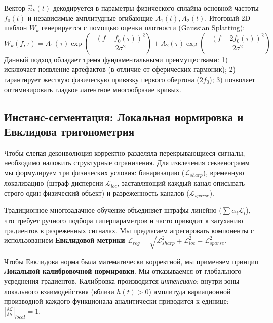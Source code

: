 \documentclass[11pt,a4paper]{article}
\begin{document}
Вектор $\vec{n}_k(t)$ декодируется в параметры физического сплайна основной частоты $f_0(t)$ и независимые амплитудные огибающие $A_1(t), A_2(t)$. Итоговый 2D-шаблон $W_k$ генерируется с помощью оценки плотности (Gaussian Splatting):
\begin{equation}
W_k(f, \tau) = A_1(\tau) \exp\left( - \frac{(f - f_0(\tau))^2}{2\sigma^2} \right) + A_2(\tau) \exp\left( - \frac{(f - 2f_0(\tau))^2}{2\sigma^2} \right)
\end{equation}
Данный подход обладает тремя фундаментальными преимуществами: 1) исключает появление артефактов (в отличие от сферических гармоник); 2) гарантирует жесткую физическую привязку первого обертона ($2f_0$); 3) позволяет оптимизировать гладкое латентное многообразие кривых.

\subsection{Инстанс-сегментация: Локальная нормировка и Евклидова тригонометрия}
Чтобы слепая деконволюция корректно разделяла перекрывающиеся сигналы, необходимо наложить структурные ограничения. Для извлечения секвенограмм мы формулируем три физических условия: бинаризацию ($\mathcal{L}_{sharp}$), временную локализацию (штраф дисперсии $\mathcal{L}_{loc}$, заставляющий каждый канал описывать строго один физический объект) и разреженность каналов ($\mathcal{L}_{sparse}$).

Традиционное многозадачное обучение объединяет штрафы линейно ($\sum \alpha_i \mathcal{L}_i$), что требует ручного подбора гиперпараметров и часто приводит к затуханию градиентов в разреженных сигналах. Мы предлагаем агрегировать компоненты с использованием \textbf{Евклидовой метрики} $\mathcal{L}_{reg} = \sqrt{\mathcal{L}_{sharp}^2 + \mathcal{L}_{loc}^2 + \mathcal{L}_{sparse}^2}$.

Чтобы Евклидова норма была математически корректной, мы применяем принцип \textbf{Локальной калибровочной нормировки}. Мы отказываемся от глобального усреднения градиентов. Калибровка производится \textit{интенсивно}: внутри зоны локального взаимодействия (вблизи $h(t) > 0$) амплитуда вариационной производной каждого функционала аналитически приводится к единице: $\left| \frac{\delta \mathcal{L}}{\delta h} \right|_{local} = 1$.
\end{document}
